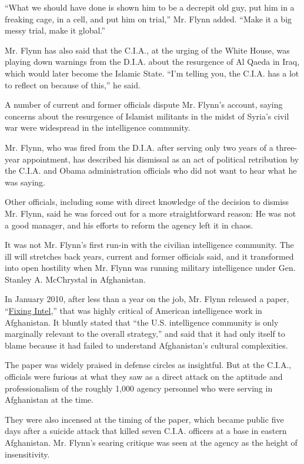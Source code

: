 ``What we should have done is shown him to be a decrepit old guy, put
him in a freaking cage, in a cell, and put him on trial,'' Mr. Flynn
added. ``Make it a big messy trial, make it global.''

Mr. Flynn has also said that the C.I.A., at the urging of the White
House, was playing down warnings from the D.I.A. about the resurgence of
Al Qaeda in Iraq, which would later become the Islamic State. ``I'm
telling you, the C.I.A. has a lot to reflect on because of this,'' he
said.

A number of current and former officials dispute Mr. Flynn's account,
saying concerns about the resurgence of Islamist militants in the midst
of Syria's civil war were widespread in the intelligence community.

Mr. Flynn, who was fired from the D.I.A. after serving only two years of
a three-year appointment, has described his dismissal as an act of
political retribution by the C.I.A. and Obama administration officials
who did not want to hear what he was saying.

Other officials, including some with direct knowledge of the decision to
dismiss Mr. Flynn, said he was forced out for a more straightforward
reason: He was not a good manager, and his efforts to reform the agency
left it in chaos.

It was not Mr. Flynn's first run-in with the civilian intelligence
community. The ill will stretches back years, current and former
officials said, and it transformed into open hostility when Mr. Flynn
was running military intelligence under Gen. Stanley A. McChrystal in
Afghanistan.

In January 2010, after less than a year on the job, Mr. Flynn released a
paper,
``\href{https://www.cnas.org/publications/reports/fixing-intel-a-blueprint-for-making-intelligence-relevant-in-afghanistan}{Fixing
Intel},'' that was highly critical of American intelligence work in
Afghanistan. It bluntly stated that ``the U.S. intelligence community is
only marginally relevant to the overall strategy,'' and said that it had
only itself to blame because it had failed to understand Afghanistan's
cultural complexities.

The paper was widely praised in defense circles as insightful. But at
the C.I.A., officials were furious at what they saw as a direct attack
on the aptitude and professionalism of the roughly 1,000 agency
personnel who were serving in Afghanistan at the time.

They were also incensed at the timing of the paper, which became public
five days after a suicide attack that killed seven C.I.A. officers at a
base in eastern Afghanistan. Mr. Flynn's searing critique was seen at
the agency as the height of insensitivity.

